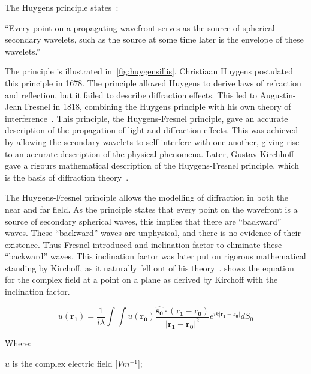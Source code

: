 The Huygens principle states~\cite{huygens2012treatise,hecht2017optics,huygens1900wave}: 

\medskip

``Every point on a propagating wavefront serves as the source of spherical secondary wavelets, such as the source at some time later is the envelope of these wavelets.''

\medskip

The principle is illustrated in~\cref{fig:huygensillis}. Christiaan Huygens postulated this principle in 1678.
The principle allowed Huygens to derive laws of refraction and reflection, but it failed to describe diffraction effects.
This led to Augustin-Jean Fresnel in 1818, combining the Huygens principle with his own theory of interference~\cite{fresnel1819memoire,huygens1900wave}.
This principle, the Huygens-Fresnel principle, gave an accurate description of the propagation of light and diffraction effects.
This was achieved by allowing the secondary wavelets to self interfere with one another, giving rise to an accurate description of the physical phenomena.
Later, Gustav Kirchhoff gave a rigours mathematical description of the Huygens-Fresnel principle, which is the basis of diffraction theory~\cite{kirchhoff1883ann,born2000principles}. 

The Huygens-Fresnel principle allows the modelling of diffraction in both the near and far field.
As the principle states that every point on the wavefront is a source of secondary spherical waves, this implies that there are ``backward'' waves.
These ``backward'' waves are unphysical, and there is no evidence of their existence.
Thus Fresnel introduced and inclination factor to eliminate these ``backward'' waves.
This inclination factor was later put on rigorous mathematical standing by Kirchoff, as it naturally fell out of his theory~\cite{kirchhoff1883ann,born2000principles}.
 shows the equation for the complex field at a point on a plane as derived by Kirchoff with the inclination factor.

\begin{equation}
u(\mathbf{r_1})=\frac{1}{i\lambda}\int\int u(\mathbf{r_0})\frac{\mathbf{\hat{s_0}} \cdot (\mathbf{r_1} - \mathbf{r_0})}{\left|\mathbf{r_1} - \mathbf{r_0}\right|^2}e^{ik\left|\mathbf{r_1} - \mathbf{r_0}\right|}dS_0
\label{eqn:kirchhoffeqn}
\end{equation}

\noindent Where:

    \indent $u$ is the complex electric field [$Vm^{-1}$];

